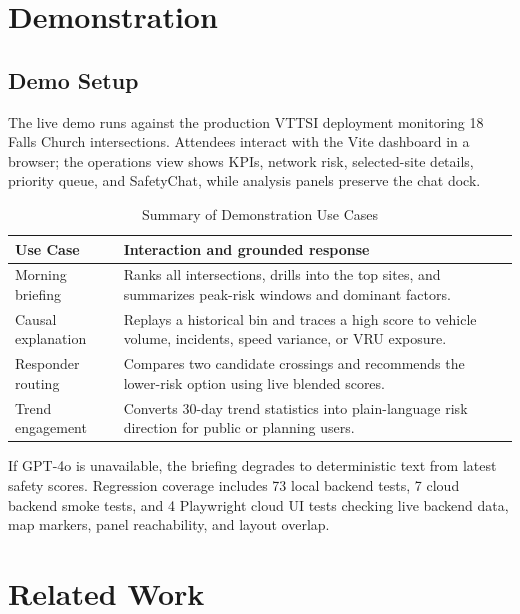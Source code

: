 \documentclass[sigconf]{acmart}
\begin{document}
\section{Demonstration}
\label{sec:demo}

\subsection{Demo Setup}

The live demo runs against the production VTTSI deployment monitoring 18
Falls Church intersections. Attendees interact with the Vite dashboard in a
browser; the operations view shows KPIs, network risk, selected-site details,
priority queue, and SafetyChat, while analysis panels preserve the chat dock.

\begin{table}[t]
\centering
\caption{Summary of Demonstration Use Cases}
\label{tbl:usecases}
\small
\begin{tabularx}{\columnwidth}{@{}l X@{}}
\toprule
\textbf{Use Case} & \textbf{Interaction and grounded response} \\
\midrule
Morning briefing & Ranks all intersections, drills into the top sites, and
summarizes peak-risk windows and dominant factors. \\
Causal explanation & Replays a historical bin and traces a high score to
vehicle volume, incidents, speed variance, or VRU exposure. \\
Responder routing & Compares two candidate crossings and recommends the
lower-risk option using live blended scores. \\
Trend engagement & Converts 30-day trend statistics into plain-language
risk direction for public or planning users. \\
\bottomrule
\end{tabularx}
\end{table}

If GPT-4o is unavailable, the briefing degrades to deterministic text from
latest safety scores. Regression coverage includes 73 local backend tests,
7 cloud backend smoke tests, and 4 Playwright cloud UI tests checking live
backend data, map markers, panel reachability, and layout overlap.

\section{Related Work}
\label{sec:related}
\end{document}
